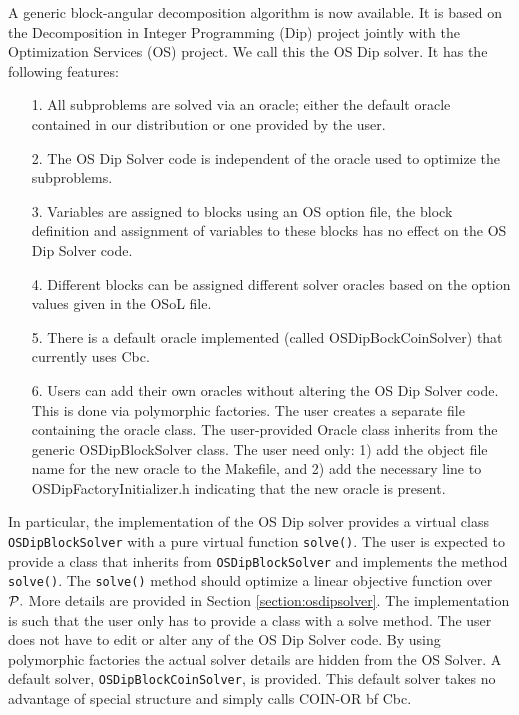 \documentclass[11pt]{article}
\begin{document}
A generic block-angular decomposition algorithm is now available. It is 
based on the Decomposition in Integer Programming (Dip) project jointly with the Optimization Services (OS) project. 
We call this the OS Dip solver.  It has the following features:

\begin{itemize}
\item[1.]  All subproblems are solved via an oracle; either the default oracle
contained in our distribution or one provided by the user.

\item[2.] The OS Dip Solver code is independent of the oracle used to optimize
the subproblems.

\item[3.] Variables are assigned to blocks using an OS option file, the block
definition and  assignment of variables to these blocks has no effect on the OS
Dip Solver code.

\item[4.] Different blocks can be assigned different solver oracles based on the
option values given in the OSoL file. 

\item[5.] There is a default oracle implemented (called OSDipBockCoinSolver)
that currently uses Cbc.

\item[6.] Users can add their own oracles without altering the OS Dip Solver
code. This is done via polymorphic factories. The user creates a separate file containing
the oracle class. The user-provided Oracle class  inherits from the generic
OSDipBlockSolver class. The user need only: 1) add the object file name for the
new oracle to the Makefile, and 2) add the necessary line to
OSDipFactoryInitializer.h indicating that the new oracle is present. 

\end{itemize}

In particular, the  implementation of the OS Dip solver provides a virtual class
{\tt OSDipBlockSolver} with a pure virtual function {\tt solve()}.  The user is
expected to provide a class that inherits from {\tt OSDipBlockSolver} and
implements the method {\tt solve()}.  The {\tt solve()} method should optimize a
linear objective function over ${\cal P}.$ More details are provided in Section
\ref{section:osdipsolver}. The implementation is such  that the user only has to
provide a class with a solve method. The user does not have to edit or alter 
any of the OS Dip Solver code.
By using polymorphic factories the actual solver details are hidden from the OS
Solver.  A default solver, {\tt OSDipBlockCoinSolver}, is provided. This default
solver takes no advantage of special structure and simply calls COIN-OR {bf
Cbc.}
 
\end{document}
